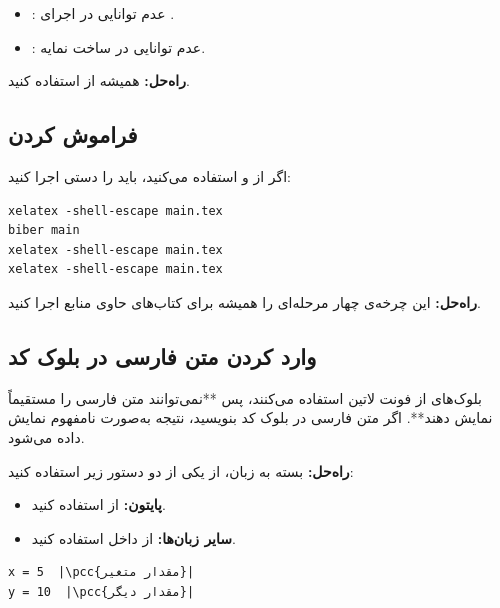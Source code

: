 \begin{itemize}
    \item {}: عدم توانایی در اجرای
    .
    \item {}: عدم توانایی در ساخت نمایه.
\end{itemize}

\textbf{راه‌حل:} همیشه از
 استفاده کنید.

\subsection{فراموش کردن }
\label{sec:introduction-mistake-biber}

اگر از  و  استفاده
می‌کنید، باید  را دستی اجرا کنید:

\begin{latin}
\begin{verbatim}
xelatex -shell-escape main.tex
biber main
xelatex -shell-escape main.tex
xelatex -shell-escape main.tex
\end{verbatim}
\end{latin}


\textbf{راه‌حل:} این چرخه‌ی چهار مرحله‌ای را
همیشه برای کتاب‌های حاوی منابع اجرا کنید.

\subsection{وارد کردن متن فارسی در بلوک کد}
\label{sec:introduction-mistake-persian-code}

بلوک‌های  از فونت لاتین استفاده
می‌کنند، پس **نمی‌توانند متن فارسی را مستقیماً
نمایش دهند**. اگر متن فارسی در بلوک کد بنویسید،
نتیجه به‌صورت نامفهوم نمایش داده می‌شود.

\textbf{راه‌حل:} بسته به زبان، از یکی از دو
دستور زیر استفاده کنید:

\begin{itemize}
    \item \textbf{پایتون:} از  استفاده
    کنید.
    \item \textbf{سایر زبان‌ها:} از
     داخل  استفاده کنید.
\end{itemize}

\begin{latin}
\begin{verbatim}
x = 5  |\pcc{مقدار متغیر}|
y = 10  |\pcc{مقدار دیگر}|
\end{verbatim}
\end{latin}

